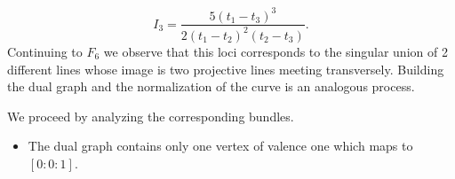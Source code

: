 \documentclass[12pt]{memoir}
\begin{document}
\begin{Ex}
    $$I_3=\frac{5(t_1-t_3)^3}{2(t_1-t_2)^2(t_2-t_3)}.$$
    Continuing to $F_6$ we observe that this loci corresponds to the singular union of 2 different lines whose image is two projective lines meeting transversely. Building the dual graph and the normalization of the curve is an analogous process.\par
    We proceed by analyzing the corresponding bundles.
    \begin{itemize}
        \item The dual graph contains only one vertex of valence one which maps to $[0:0:1]$.
    \end{itemize}
\end{Ex}
\ifx\nextra\undefined
\printindex
\else\fi
\nocite{*}


\end{document}
